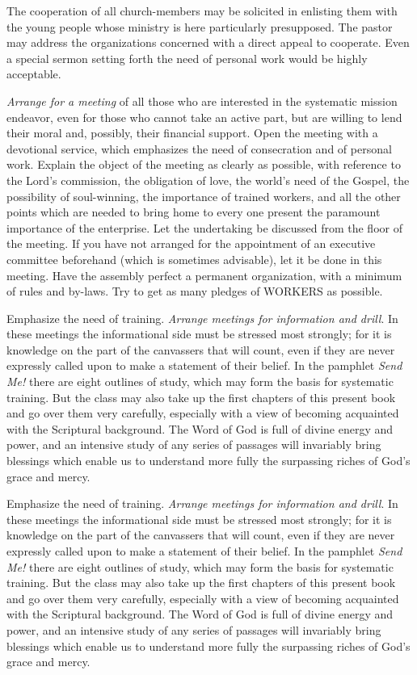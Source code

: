 \documentclass[
]{book}
\begin{document}
The cooperation of all church-members may be solicited in enlisting them with the young people whose ministry is here particularly presupposed. The pastor may address the organizations concerned with a direct appeal to cooperate. Even a special sermon setting forth the need of personal work would be highly acceptable.

\emph{Arrange for a meeting} of all those who are interested in the systematic mission endeavor, even for those who cannot take an active part, but are willing to lend their moral and, possibly, their financial support. Open the meeting with a devotional service, which emphasizes the need of consecration and of personal work. Explain the object of the meeting as clearly as possible, with reference to the Lord's commission, the obligation of love, the world's need of the Gospel, the possibility of soul-winning, the importance of trained workers, and all the other points which are needed to bring home to every one present the paramount importance of the enterprise. Let the undertaking be discussed from the floor of the meeting. If you have not arranged for the appointment of an executive committee beforehand (which is sometimes advisable), let it be done in this meeting. Have the assembly perfect a permanent organization, with a minimum of rules and by-laws. Try to get as many pledges of WORKERS as possible.

Emphasize the need of training. \emph{Arrange meetings for information and drill}. In these meetings the informational side must be stressed most strongly; for it is knowledge on the part of the canvassers that will count, even if they are never expressly called upon to make a statement of their belief. In the pamphlet \emph{Send Me!} there are eight outlines of study, which may form the basis for systematic training. But the class may also take up the first chapters of this present book and go over them very carefully, especially with a view of becoming acquainted with the Scriptural background. The Word of God is full of divine energy and power, and an intensive study of any series of passages will invariably bring blessings which enable us to understand more fully the surpassing riches of God's grace and mercy.

Emphasize the need of training. \emph{Arrange meetings for information and drill}. In these meetings the informational side must be stressed most strongly; for it is knowledge on the part of the canvassers that will count, even if they are never expressly called upon to make a statement of their belief. In the pamphlet \emph{Send Me!} there are eight outlines of study, which may form the basis for systematic training. But the class may also take up the first chapters of this present book and go over them very carefully, especially with a view of becoming acquainted with the Scriptural background. The Word of God is full of divine energy and power, and an intensive study of any series of passages will invariably bring blessings which enable us to understand more fully the surpassing riches of God's grace and mercy.
\end{document}
